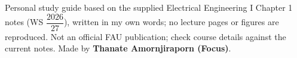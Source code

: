 \documentclass[11pt]{article}
\begin{document}
\vfill{\small Personal study guide based on the supplied Electrical Engineering I Chapter 1 notes (WS {\small\ensuremath{\dfrac{2026}{27}}}), written in my own words; no lecture pages or figures are reproduced. Not an official FAU publication; check course details against the current notes. Made by \textbf{Thanate Amornjiraporn (Focus)}.}
\end{document}
